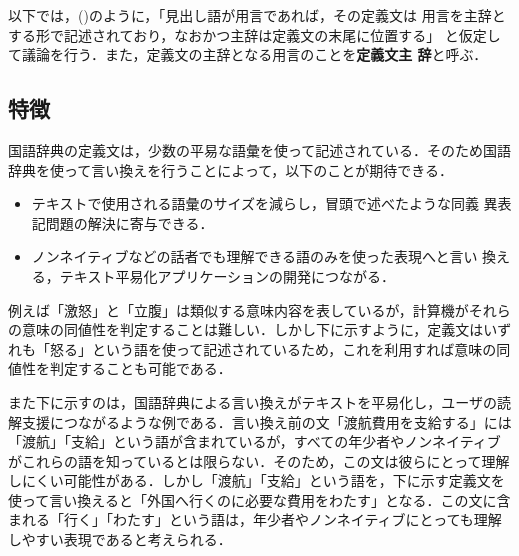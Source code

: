 以下では，(\theparactr)のように，「見出し語が用言であれば，その定義文は
用言を主辞とする形で記述されており，なおかつ主辞は定義文の末尾に位置する」
と仮定して議論を行う．また，定義文の主辞となる用言のことを{\bf 定義文主
辞}と呼ぶ．





\subsection{特徴}

国語辞典の定義文は，少数の平易な語彙を使って記述されている．そのため国語
辞典を使って言い換えを行うことによって，以下のことが期待できる．

\begin{itemize}
 \item テキストで使用される語彙のサイズを減らし，冒頭で述べたような同義
       異表記問題の解決に寄与できる．
 \item ノンネイティブなどの話者でも理解できる語のみを使った表現へと言い
       換える，テキスト平易化アプリケーションの開発につながる．
\end{itemize}

例えば「激怒」と「立腹」は類似する意味内容を表しているが，計算機がそれら
の意味の同値性を判定することは難しい．しかし下に示すように，定義文はいず
れも「怒る」という語を使って記述されているため，これを利用すれば意味の同
値性を判定することも可能である．



また下に示すのは，国語辞典による言い換えがテキストを平易化し，ユーザの読
解支援につながるような例である．言い換え前の文「渡航費用を支給する」には
「渡航」「支給」という語が含まれているが，すべての年少者やノンネイティブ
がこれらの語を知っているとは限らない．そのため，この文は彼らにとって理解
しにくい可能性がある．しかし「渡航」「支給」という語を，下に示す定義文を
使って言い換えると「外国へ行くのに必要な費用をわたす」となる．この文に含
まれる「行く」「わたす」という語は，年少者やノンネイティブにとっても理解
しやすい表現であると考えられる．





